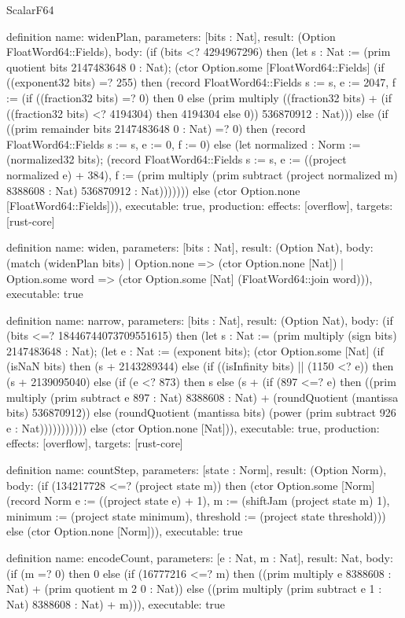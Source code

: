 \begin{lexlean}{ScalarF64}
\begin{semanticmodule}
definition{
  name: widenPlan,
  parameters: [bits : Nat],
  result: (Option FloatWord64::Fields),
  body: (if (bits <? 4294967296) then (let s : Nat := (prim quotient bits 2147483648 0 : Nat); (ctor Option.some [FloatWord64::Fields] (if ((exponent32 bits) =? 255) then (record FloatWord64::Fields {s := s, e := 2047, f := (if ((fraction32 bits) =? 0) then 0 else (prim multiply ((fraction32 bits) + (if ((fraction32 bits) <? 4194304) then 4194304 else 0)) 536870912 : Nat))}) else (if ((prim remainder bits 2147483648 0 : Nat) =? 0) then (record FloatWord64::Fields {s := s, e := 0, f := 0}) else (let normalized : Norm := (normalized32 bits); (record FloatWord64::Fields {s := s, e := ((project normalized e) + 384), f := (prim multiply (prim subtract (project normalized m) 8388608 : Nat) 536870912 : Nat)})))))) else (ctor Option.none [FloatWord64::Fields])),
  executable: true,
  production: {effects: [overflow], targets: [rust-core]}
}

definition{
  name: widen,
  parameters: [bits : Nat],
  result: (Option Nat),
  body: (match (widenPlan bits)
    | Option.none => (ctor Option.none [Nat])
    | Option.some word => (ctor Option.some [Nat] (FloatWord64::join word))),
  executable: true
}

definition{
  name: narrow,
  parameters: [bits : Nat],
  result: (Option Nat),
  body: (if (bits <=? 18446744073709551615) then (let s : Nat := (prim multiply (sign bits) 2147483648 : Nat); (let e : Nat := (exponent bits); (ctor Option.some [Nat] (if (isNaN bits) then (s + 2143289344) else (if ((isInfinity bits) || (1150 <? e)) then (s + 2139095040) else (if (e <? 873) then s else (s + (if (897 <=? e) then ((prim multiply (prim subtract e 897 : Nat) 8388608 : Nat) + (roundQuotient (mantissa bits) 536870912)) else (roundQuotient (mantissa bits) (power (prim subtract 926 e : Nat))))))))))) else (ctor Option.none [Nat])),
  executable: true,
  production: {effects: [overflow], targets: [rust-core]}
}

definition{
  name: countStep,
  parameters: [state : Norm],
  result: (Option Norm),
  body: (if (134217728 <=? (project state m)) then (ctor Option.some [Norm] (record Norm {e := ((project state e) + 1), m := (shiftJam (project state m) 1), minimum := (project state minimum), threshold := (project state threshold)})) else (ctor Option.none [Norm])),
  executable: true
}

definition{
  name: encodeCount,
  parameters: [e : Nat, m : Nat],
  result: Nat,
  body: (if (m =? 0) then 0 else (if (16777216 <=? m) then ((prim multiply e 8388608 : Nat) + (prim quotient m 2 0 : Nat)) else ((prim multiply (prim subtract e 1 : Nat) 8388608 : Nat) + m))),
  executable: true
}


\end{semanticmodule}
\end{lexlean}
